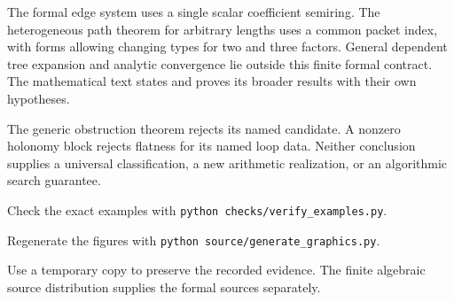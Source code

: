 The formal edge system uses a single scalar coefficient semiring. The heterogeneous path theorem for arbitrary lengths uses a common packet index, with forms allowing changing types for two and three factors. General dependent tree expansion and analytic convergence lie outside this finite formal contract. The mathematical text states and proves its broader results with their own hypotheses.

The generic obstruction theorem rejects its named candidate. A nonzero holonomy block rejects flatness for its named loop data. Neither conclusion supplies a universal classification, a new arithmetic realization, or an algorithmic search guarantee.

Check the exact examples with \mbox{\texttt{python checks/verify\_examples.py}}.\par
Regenerate the figures with \mbox{\texttt{python source/generate\_graphics.py}}.\par
Use a temporary copy to preserve the recorded evidence. The finite algebraic source distribution supplies the formal sources separately.

